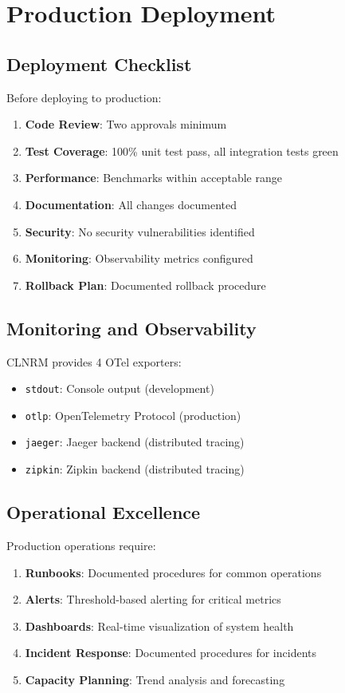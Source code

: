 \documentclass[12pt,twoside,openright]{book}
\theoremstyle{plain}
\theoremstyle{definition}
\theoremstyle{remark}
\begin{document}
\chapter{Production Deployment}

\section{Deployment Checklist}

Before deploying to production:

\begin{enumerate}
  \item \textbf{Code Review}: Two approvals minimum
  \item \textbf{Test Coverage}: 100\% unit test pass, all integration tests green
  \item \textbf{Performance}: Benchmarks within acceptable range
  \item \textbf{Documentation}: All changes documented
  \item \textbf{Security}: No security vulnerabilities identified
  \item \textbf{Monitoring}: Observability metrics configured
  \item \textbf{Rollback Plan}: Documented rollback procedure
\end{enumerate}

\section{Monitoring and Observability}

CLNRM provides 4 OTel exporters:

\begin{itemize}
  \item \texttt{stdout}: Console output (development)
  \item \texttt{otlp}: OpenTelemetry Protocol (production)
  \item \texttt{jaeger}: Jaeger backend (distributed tracing)
  \item \texttt{zipkin}: Zipkin backend (distributed tracing)
\end{itemize}

\section{Operational Excellence}

Production operations require:

\begin{enumerate}
  \item \textbf{Runbooks}: Documented procedures for common operations
  \item \textbf{Alerts}: Threshold-based alerting for critical metrics
  \item \textbf{Dashboards}: Real-time visualization of system health
  \item \textbf{Incident Response}: Documented procedures for incidents
  \item \textbf{Capacity Planning}: Trend analysis and forecasting
\end{enumerate}
\end{document}
